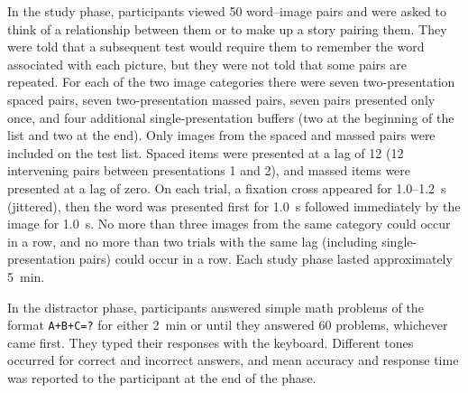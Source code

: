 


In the study phase, participants viewed 50 word--image pairs and were asked to think of a relationship between them or to make up a story pairing them.  They were told that a subsequent test would require them to remember the word associated with each picture, but they were not told that some pairs are repeated.  For each of the two image categories there were seven two-presentation spaced pairs, seven two-presentation massed pairs, seven pairs presented only once, and four additional single-presentation buffers (two at the beginning of the list and two at the end).  Only images from the spaced and massed pairs were included on the test list.
Spaced items were presented at a lag of 12 (12 intervening pairs between presentations 1 and 2), and massed items were presented at a lag of zero.  On each trial, a fixation cross appeared for 1.0--1.2~s (jittered), then the word was presented first for 1.0~s followed immediately by the image for 1.0~s.  No more than three images from the same category could occur in a row, and no more than two trials with the same lag (including single-presentation pairs) could occur in a row.  Each study phase lasted approximately 5~min.

In the distractor phase, participants answered simple math problems of the format \texttt{A+B+C=?} for either 2~min or until they answered 60 problems, whichever came first.  They typed their responses with the keyboard. Different tones occurred for correct and incorrect answers, and mean accuracy and response time was reported to the participant at the end of the phase.


